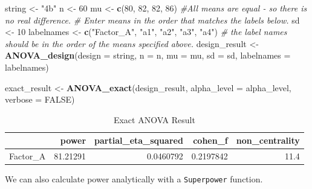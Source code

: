 \documentclass[]{book}
\newenvironment{Shaded}{\begin{snugshade}}{\end{snugshade}}
\newcommand{\CommentTok}[1]{\textcolor[rgb]{0.56,0.35,0.01}{\textit{#1}}}
\newcommand{\DataTypeTok}[1]{\textcolor[rgb]{0.13,0.29,0.53}{#1}}
\newcommand{\DecValTok}[1]{\textcolor[rgb]{0.00,0.00,0.81}{#1}}
\newcommand{\KeywordTok}[1]{\textcolor[rgb]{0.13,0.29,0.53}{\textbf{#1}}}
\newcommand{\NormalTok}[1]{#1}
\newcommand{\OperatorTok}[1]{\textcolor[rgb]{0.81,0.36,0.00}{\textbf{#1}}}
\newcommand{\OtherTok}[1]{\textcolor[rgb]{0.56,0.35,0.01}{#1}}
\newcommand{\StringTok}[1]{\textcolor[rgb]{0.31,0.60,0.02}{#1}}
\begin{document}
\begin{Shaded}
\begin{Highlighting}[]
\NormalTok{string <-}\StringTok{ "4b"}
\NormalTok{n <-}\StringTok{ }\DecValTok{60}
\NormalTok{mu <-}\StringTok{ }\KeywordTok{c}\NormalTok{(}\DecValTok{80}\NormalTok{, }\DecValTok{82}\NormalTok{, }\DecValTok{82}\NormalTok{, }\DecValTok{86}\NormalTok{) }
\CommentTok{#All means are equal - so there is no real difference.}
\CommentTok{# Enter means in the order that matches the labels below.}
\NormalTok{sd <-}\StringTok{ }\DecValTok{10}
\NormalTok{labelnames <-}\StringTok{ }\KeywordTok{c}\NormalTok{(}\StringTok{"Factor_A"}\NormalTok{, }\StringTok{"a1"}\NormalTok{, }\StringTok{"a2"}\NormalTok{, }\StringTok{"a3"}\NormalTok{, }\StringTok{"a4"}\NormalTok{) }
\CommentTok{# the label names should be in the order of the means specified above.}
\NormalTok{design_result <-}\StringTok{ }\KeywordTok{ANOVA_design}\NormalTok{(}\DataTypeTok{design =}\NormalTok{ string,}
                   \DataTypeTok{n =}\NormalTok{ n, }
                   \DataTypeTok{mu =}\NormalTok{ mu, }
                   \DataTypeTok{sd =}\NormalTok{ sd, }
                   \DataTypeTok{labelnames =}\NormalTok{ labelnames)}


\NormalTok{exact_result <-}\StringTok{ }\KeywordTok{ANOVA_exact}\NormalTok{(design_result,}
                            \DataTypeTok{alpha_level =}\NormalTok{ alpha_level,}
                            \DataTypeTok{verbose =} \OtherTok{FALSE}\NormalTok{)}
\end{Highlighting}
\end{Shaded}

\begin{table}[!h]

\caption{\label{tab:unnamed-chunk-304}Exact ANOVA Result}
\centering
\begin{tabular}{l|r|r|r|r}
\hline
  & power & partial\_eta\_squared & cohen\_f & non\_centrality\\
\hline
Factor\_A & 81.21291 & 0.0460792 & 0.2197842 & 11.4\\
\hline
\end{tabular}
\end{table}

We can also calculate power analytically with a \texttt{Superpower} function.

\begin{Shaded}
\end{Shaded}
\end{document}
